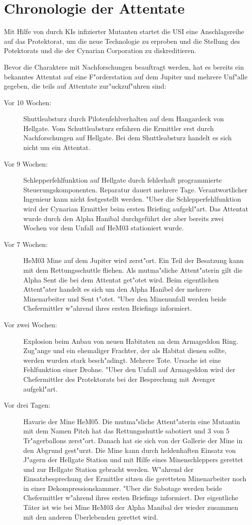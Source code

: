 \section{Chronologie der Attentate}

Mit Hilfe von durch KIs infizierter Mutanten startet die USI eine Anschlagsreihe auf das Protektorat, um die neue Technologie zu erproben und die Stellung des Potektorats und die der Cynarian Corporation zu diskreditieren.

Bevor die Charaktere mit Nachforschungen beauftragt werden, hat es bereits ein bekanntes Attentat auf eine F"orderstation auf dem Jupiter und mehrere Unf"alle gegeben, die teils auf Attentate zur"uckzuf"uhren sind:

\begin{description}
\item [Vor 10 Wochen:] Shuttleabsturz durch Pilotenfehlverhalten auf dem Hangardeck von Hellgate. Vom Schuttleabsturz erfahren die 
      Ermittler erst durch Nachforschungen auf Hellgate. Bei dem Shuttleabsturz handelt es sich nicht um ein Attentat.
\item [Vor 9 Wochen:] Schlepperfehlfunktion auf Hellgate durch fehlerhaft programmierte Steuerungskomponenten. Reparatur dauert
      mehrere Tage. Verantwortlicher Ingenieur kann nicht festgestellt werden. "Uber die Schlepperfehlfunktion wird der Cynarian Ermittler beim ersten Briefing aufgekl"art. Das Attentat wurde durch den Alpha Hanibal durchgeführt der aber bereits zwei Wochen vor dem Unfall auf HeM03 stationiert wurde.      
\item [Vor 7 Wochen:] HeM03 Mine auf dem Jupiter wird zerst"ort. Ein Teil der Besatzung kann mit dem
      Rettungsschuttle fliehen. Als mutma"sliche Attent"aterin gilt die Alpha Sent die bei dem Attentat get"otet wird. Beim eigentlichen Attent"ater handelt es sich um den Alpha Hanibel der mehrere Minenarbeiter und Sent t"otet. "Uber den Minenunfall werden beide Chefermittler w"ahrend ihres ersten Briefings informiert.
\item [Vor zwei Wochen:] Explosion beim Anbau von neuen Habitaten an dem Armageddon Ring. Zug"ange und ein
      ehemaliger Frachter, der als Habitat dienen sollte, werden wurden stark besch"adingt.  Mehrere Tote. Ursache ist eine Fehlfunktion einer Drohne. "Uber den Unfall auf Armageddon wird der Chefermittler des Protektorats bei der Besprechung mit Avenger aufgekl"art.
\item [Vor drei Tagen:] Havarie der Mine HeM05. Die mutma"sliche Attent"aterin eine Mutantin mit dem Namen Pitch hat das
      Rettungsshuttle sabotiert und 3 von 5 Tr"agerballons zerst"ort. Danach hat sie sich von der Gallerie der Mine in den Abgrund gest"urzt. Die Mine kann durch heldenhaften Einsatz von J"agern der Hellgate Station und mit Hilfe eines Minenschleppers gerettet und zur Hellgate Station gebracht werden. W"ahrend der Einsatzbesprechung der Ermittler sitzen die geretteten Minenarbeiter noch in einer Dekompressionskammer. "Uber die Sabotage werden beide Chefermittler w"ahrend ihres ersten Briefings informiert. Der eigentliche
      Täter ist wie bei Mine HeM03 der Alpha Manibal der wieder zusammen mit den anderen Überlebenden gerettet wird.
\end{description}

